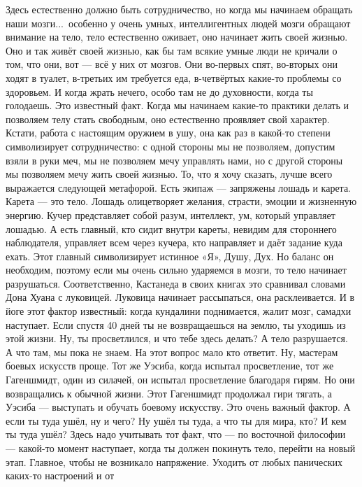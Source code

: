 \T
Здесь естественно должно быть сотрудничество, но когда мы начинаем обращать
наши мозги...\ особенно у
очень умных, интеллигентных людей мозги обращают внимание на тело, тело естественно
оживает, оно начинает жить
своей жизнью. Оно и так живёт своей жизнью, как бы там всякие умные люди не
кричали о том, что они, вот --- всё у них от мозгов. Они во-первых спят, во-вторых они ходят в
туалет, в-третьих им
требуется еда, в-четвёртых какие-то проблемы со здоровьем. И когда жрать нечего, особо там не
до духовности, когда ты
голодаешь. Это известный факт.\hfil\break
\indent
Когда мы начинаем
какие-то практики делать и позволяем телу стать свободным, оно естественно проявляет свой
характер. Кстати, работа с настоящим оружием в ушу, она как раз в какой-то степени
символизирует сотрудничество: с
одной стороны мы не позволяем, допустим взяли в руки меч, мы не позволяем мечу управлять нами,
но с другой стороны
мы позволяем мечу жить своей жизнью.\hfil\break
\indent
То, что я хочу сказать, лучше всего выражается следующей метафорой.
Есть экипаж --- запряжены лошадь и карета.
Карета --- это тело. Лошадь олицетворяет желания, страсти, эмоции и жизненную энергию.
Кучер представляет собой разум, интеллект, ум, который управляет лошадью.
А есть главный, кто сидит внутри кареты, невидим для стороннего
наблюдателя, управляет всем через кучера, кто
направляет и даёт
задание куда ехать. Этот главный символизирует истинное «Я», Душу, Дух.\hfil\break
\indent
Но баланс он необходим, поэтому если мы очень сильно ударяемся в мозги, то тело начинает
разрушаться.
Соответственно, Кастанеда в своих книгах это сравнивал словами Дона Хуана с луковицей.
Луковица начинает
рассыпаться, она расклеивается. И в йоге этот фактор известный: когда кундалини
поднимается, жалит мозг, самадхи
наступает. Если спустя 40 дней ты не возвращаешься на землю, ты уходишь из
этой жизни. Ну, ты
просветлился, и что тебе здесь делать? А тело разрушается. А что там, мы пока не знаем. На
этот вопрос мало кто
ответит.\hfil\break
\indent
Ну, мастерам боевых искусств проще. Тот же Уэсиба, когда  испытал просветление, тот же
Гагеншмидт, один из силачей,
он испытал просветление благодаря гирям. Но они возвращались к обычной жизни. Этот
Гагеншмидт продолжал гири
тягать, а Уэсиба --- выступать и обучать боевому искусству.
Это очень важный фактор. А если ты туда ушёл, ну и чего? Ну ушёл ты туда, а что ты
для мира, кто? И кем ты
туда ушёл? Здесь надо учитывать тот факт, что --- по восточной философии --- какой-то момент
наступает, когда ты должен покинуть тело, перейти на новый этап.
Главное, чтобы не возникало напряжение. Уходить от любых панических каких-то настроений и от
